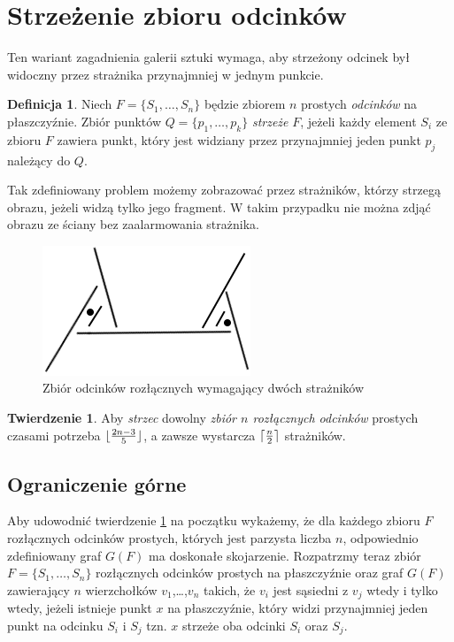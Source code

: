 \documentclass[brudnopis]{xmgr}
\DeclarePairedDelimiter\ceil{\lceil}{\rceil}
\DeclarePairedDelimiter\floor{\lfloor}{\rfloor}
\theoremstyle{definition}
\newtheorem{Twierdzenie}{Twierdzenie}
\newtheorem{Definicja}{Definicja}
\begin{document}
\section{Strzeżenie zbioru odcinków}
Ten wariant zagadnienia galerii sztuki wymaga, aby strzeżony odcinek był widoczny przez strażnika przynajmniej w jednym punkcie. 
\begin{Definicja}
Niech $F = \{S_1,\ldots,S_n\}$ będzie zbiorem $n$ prostych \emph{odcinków} na płaszczyźnie. Zbiór punktów $Q = \{p_1,\ldots,p_k\}$ \emph{strzeże} $F$, jeżeli każdy element $S_i$ ze zbioru $F$ zawiera punkt, który jest widziany przez przynajmniej jeden punkt $p_j$ należący do $Q$.
\end{Definicja}
Tak zdefiniowany problem możemy zobrazować przez strażników, którzy strzegą obrazu, jeżeli widzą tylko jego fragment. W takim przypadku nie można zdjąć obrazu ze ściany bez zaalarmowania strażnika.
\begin{figure}[ht!]
 \centering
  \includegraphics{rysunki/rozlaczny_dwoch_straznikow.png}
  \caption{Zbiór odcinków rozłącznych wymagający dwóch strażników}
\end{figure} 

\begin{Twierdzenie} \label{straznicy strzezenie} \cite{illumination}
Aby \emph{strzec} dowolny \emph{zbiór $n$ rozłącznych odcinków} prostych czasami potrzeba $\floor{\frac{2n-3}{5}}$, a zawsze wystarcza $\ceil{\frac{n}{2}}$ strażników.
\end{Twierdzenie}

\subsection{Ograniczenie górne}
Aby udowodnić twierdzenie \ref{straznicy strzezenie} na początku wykażemy, że dla każdego zbioru $F$ rozłącznych odcinków prostych, których jest parzysta liczba $n$, odpowiednio zdefiniowany graf $G(F)$ ma doskonałe skojarzenie.
Rozpatrzmy teraz zbiór $F =\{S_1,\ldots,S_n\}$ rozłącznych odcinków prostych na płaszczyźnie oraz graf $G(F)$ zawierający $n$ wierzchołków $v_1$,\ldots,$v_n$ takich, że $v_i$ jest sąsiedni z $v_j$ wtedy i tylko wtedy, jeżeli istnieje punkt $x$ na płaszczyźnie, który widzi przynajmniej jeden punkt na odcinku $S_i$ i $S_j$ tzn. $x$ strzeże oba odcinki $S_i$ oraz $S_j$.
\end{document}
